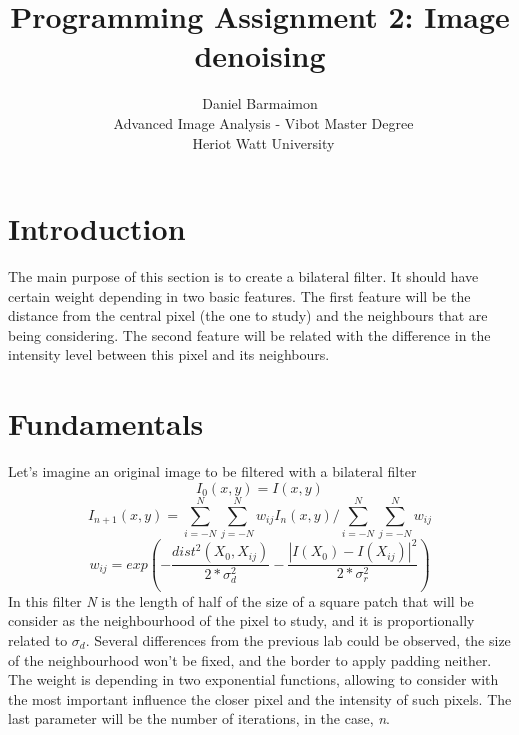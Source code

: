 \documentclass[a4paper, 10pt, conference] {article}
\begin{document}
\date{}
\title{\LARGE \bf
Programming Assignment 2: Image denoising 
}

\author{ \parbox{5 in}{\centering Daniel Barmaimon \\
         \ Advanced Image Analysis - Vibot Master Degree\\
         \ Heriot Watt University\\         
}}

\maketitle









\section{Introduction}
The main purpose of this section is to create a bilateral filter. It should have certain weight depending in two basic features. The first feature will be the distance from the central pixel (the one to study) and the neighbours that are being considering. The second feature will be related with the difference in the intensity level between this pixel and its neighbours.

\section{Fundamentals}
Let's imagine an original image to be filtered with a bilateral filter
\begin{equation}
I_{0}(x,y) = I(x,y)
\end{equation} 
\begin{equation}
I_{n+1}(x,y) = \sum\limits_{i=-N}^N\sum\limits_{j=-N}^N w_{ij}I_{n}(x, y)/\sum\limits_{i=-N}^N\sum\limits_{j=-N}^N w_{ij} 
\end{equation}
\begin{equation}
w_{ij} = exp \left(- \frac {dist^2(X_{0}, X_{ij})}{2*\sigma^2_{d}} - \frac{\left| I(X_{0})-I(X_{ij})\right|^2}{2*\sigma^2_{r}}\right)
\end{equation}
In this filter \textit{N} is the length of half of the size of a square patch that will be consider as the neighbourhood of the pixel to study, and it is proportionally related to $\sigma_{d}$.
Several differences from the previous lab could be observed, the size of the neighbourhood won't be fixed, and the border to apply padding neither. The weight is depending in two exponential functions, allowing to consider with the most important influence the closer pixel and the intensity of such pixels. 
The last parameter will be the number of iterations, in the case, \textit{n}. 
\end{document}
